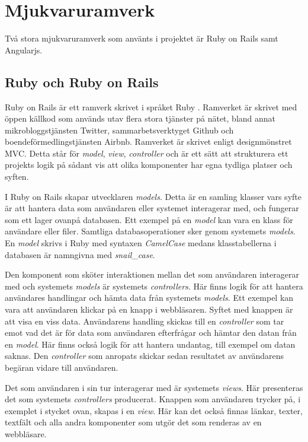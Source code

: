 \section{Mjukvaruramverk}
Två stora mjukvaruramverk som använts i projektet är Ruby on Rails samt Angularjs.

\subsection{Ruby och Ruby on Rails}
Ruby on Rails är ett ramverk skrivet i språket Ruby \cite{rubylang}. Ramverket är skrivet med öppen källkod som används utav flera stora tjänster på nätet, bland annat mikrobloggstjänsten Twitter, sammarbetsverktyget Github och boendeförmedlingstjänsten Airbnb. Ramverket är skrivet enligt designmönstret MVC. Detta står för \textit{model}, \textit{view}, \textit{controller} och är ett sätt att strukturera ett projekts logik på sådant vis att olika komponenter har egna tydliga platser och syften.

I Ruby on Rails skapar utvecklaren \textit{models}. Detta är en samling klasser vars syfte är att hantera data som användaren eller systemet interagerar med, och fungerar som ett lager ovanpå databasen. Ett exempel på en \textit{model} kan vara en klass för användare eller filer. Samtliga databasoperationer sker genom systemets \textit{models}. En \textit{model} skrivs i Ruby med syntaxen \textit{CamelCase} medans klasstabellerna i databasen är namngivna med \textit{snail}\_\textit{case}.

Den komponent som sköter interaktionen mellan det som användaren interagerar med och systemets \textit{models} är systemets \textit{controllers}. Här finns logik för att hantera användares handlingar och hämta data från systemets \textit{models}. Ett exempel kan vara att användaren klickar på en knapp i webbläsaren. Syftet med knappen är att visa en viss data. Användarens handling skickas till en \textit{controller} som tar emot vad det är för data som användaren efterfrågar och hämtar den datan från en \textit{model}. Här finns också logik för att hantera undantag, till exempel om datan saknas. Den \textit{controller} som anropats skickar sedan resultatet av användarens begäran vidare till användaren.

Det som användaren i sin tur interagerar med är systemets \textit{views}. Här presenteras det som systemets \textit{controllers} producerat. Knappen som användaren trycker på, i exemplet i stycket ovan, skapas i en \textit{view}. Här kan det också finnas länkar, texter, textfält och alla andra komponenter som utgör det som renderas av en webbläsare.

